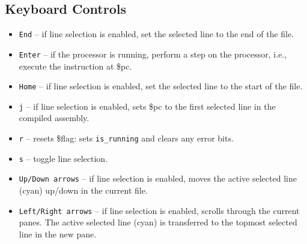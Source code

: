 \documentclass[10pt]{article}
\begin{document}
    \subsection{Keyboard Controls}

    \begin{itemize}
        \item \texttt{End} -- if line selection is enabled, set the selected line to the end of the file.
        \item \texttt{Enter} -- if the processor is running, perform a step on the processor, i.e., execute the instruction at \$pc.
        \item \texttt{Home} -- if line selection is enabled, set the selected line to the start of the file.
        \item \texttt{j} -- if line selection is enabled, sets \$pc to the first selected line in the compiled assembly.
        \item \texttt{r} -- resets \$flag: sets \texttt{is\_running} and clears any error bits.
        \item \texttt{s} -- toggle line selection.
        \item \texttt{Up/Down arrows} -- if line selection is enabled, moves the active selected line (cyan) up/down in the current file.
        \item \texttt{Left/Right arrows} -- if line selection is enabled, scrolls through the current panes.
        The active selected line (cyan) is transferred to the topmost selected line in the new pane.
    \end{itemize}
\end{document}
